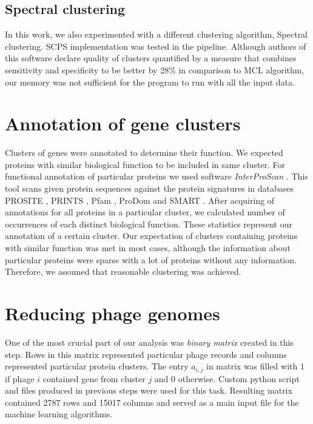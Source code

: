 \subsection{Spectral clustering}
In this work, we also experimented with a different clustering algorithm, Spectral clustering.
SCPS implementation\cite{scps} was tested in the pipeline.
Although authors of this software declare quality of clusters quantified by a measure that combines sensitivity and specificity to be better by 28\% in comparison to MCL algorithm, our memory was not sufficient for the program to run with all the input data.

\section{Annotation of gene clusters}
Clusters of genes were annotated to determine their function.
We expected proteins with similar biological function to be included in same cluster.
For functional annotation of particular proteins we used software \emph{InterProScan} \cite{interpro}.
This tool scans given protein sequences against the protein signatures in databases PROSITE \cite{prosite}, PRINTS \cite{prints}, Pfam \cite{pfam}, ProDom \cite{prodom} and SMART \cite{smart}.
After acquiring of annotations for all proteins in a particular cluster, we calculated number of occurrences of each distinct biological function.
These statistics represent our annotation of a certain cluster.
Our expectation of clusters containing proteins with similar function was met in most cases, although the information about particular proteins were sparse with a lot of proteins without any information.
Therefore, we assumed that reasonable clustering was achieved.

\section{Reducing phage genomes}
One of the most crucial part of our analysis was \emph{binary matrix} created in this step.
Rows in this matrix represented particular phage records and columns represented particular protein clusters.
The entry $a_{i,j}$ in matrix was filled with $1$ if phage $i$ contained gene from cluster $j$ and $0$ otherwise.
Custom python script and files produced in previous steps were used for this task.
Resulting matrix contained 2787 rows and 15017 columns and served as a main input file for the machine learning algorithms.